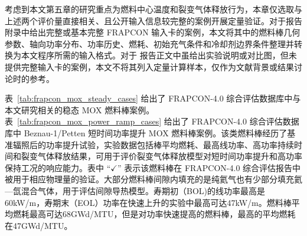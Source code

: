 考虑到本文第五章的研究重点为燃料中心温度和裂变气体释放行为，本章仅选取与上述两个评价量直接相关、且公开输入信息较完整的案例开展定量验证。对于报告附录中给出完整或基本完整 FRAPCON 输入卡的案例，本文将其中的燃料棒几何参数、轴向功率分布、功率历史、燃耗、初始充气条件和冷却剂边界条件整理并转换为本文程序所需的输入格式。对于 报告正文中虽给出实验说明或对比图，但未提供完整输入卡的案例，本文不将其列入定量计算样本，仅作为文献背景或结果讨论时的参考。

表~\ref{tab:frapcon_mox_steady_cases} 给出了 FRAPCON-4.0 综合评估数据库中与本文研究相关的稳态 MOX 燃料棒案例。表~\ref{tab:frapcon_mox_power_ramp_cases} 给出了 FRAPCON-4.0 综合评估数据库中 Beznau-1/Petten 短时间功率提升 MOX 燃料棒案例。该类燃料棒经历了基准辐照后的功率提升试验，实验数据包括棒平均燃耗、最高线功率、高功率持续时间和裂变气体释放结果，可用于评价裂变气体释放模型对短时间功率提升和高功率保持工况的响应能力。表中 ``$\checkmark$'' 表示该燃料棒在 FRAPCON-4.0 综合评估报告中被用于相应物理量的验证。大部分燃料棒间隙内填充的是纯氦气也有少部分填充氦—氙混合气体，用于评估间隙导热模型。寿期初（BOL)的线功率最高是60kW/m，寿期末（EOL）功率在快速上升的实验中最高可达47kW/m。燃料棒平均燃耗最高可达68GWd/MTU，但是对功率快速提高的燃料棒，最高的平均燃耗在47GWd/MTU。

